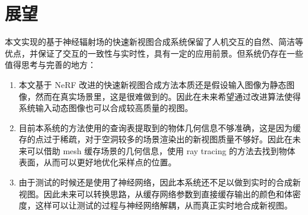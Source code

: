 \section{展望}
本文实现的基于神经辐射场的快速新视图合成系统保留了人机交互的自然、简洁等优点，并保证了交互的一致性与实时性，具有一定的应用前景。但系统仍存在一些值得思考与完善的地方：
\begin{enumerate}
	\item 本文基于 NeRF 改进的快速新视图合成方法本质还是假设输入图像为静态图像，然而在真实场景里，这是很难做到的。因此在未来希望通过改进算法使得系统输入动态图像也可以合成较高质量的视图。
	\item 目前本系统的方法使用的查询表提取到的物体几何信息不够准确，这是因为缓存的点过于稀疏，对于空洞较多的场景渲染出的新视图质量不够好。因此在未来可以借助 mesh 缓存场景的几何信息，使用 ray tracing 的方法去找到物体表面，从而可以更好地优化采样点的位置。
	\item 由于测试的时候还是使用了神经网络，因此本系统还不足以做到实时的合成新视图。因此未来可以转换思路，从缓存网络参数到直接缓存输出的颜色和体密度，这样可以让测试的过程与神经网络解耦，从而真正实时地合成新视图。
\end{enumerate}

















